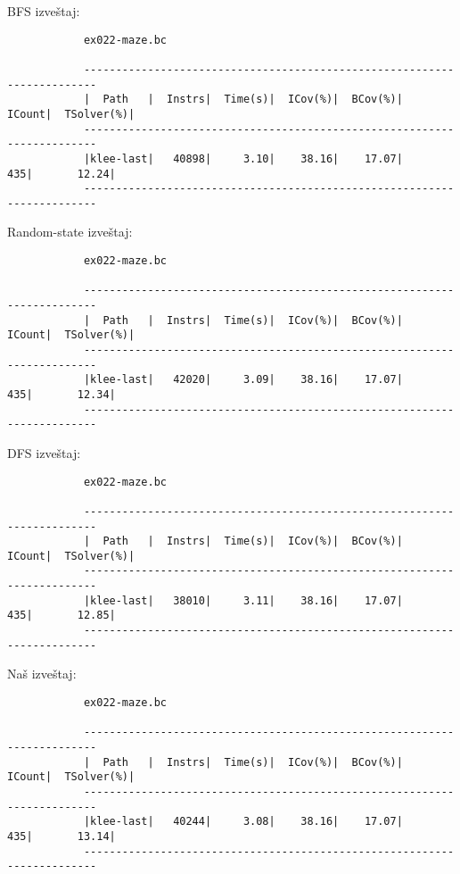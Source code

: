 \documentclass[a4paper]{article}
\begin{document}
{		BFS izveštaj:
		
		\begin{verbatim}
			ex022-maze.bc
			
			------------------------------------------------------------------------
			|  Path   |  Instrs|  Time(s)|  ICov(%)|  BCov(%)|  ICount|  TSolver(%)|
			------------------------------------------------------------------------
			|klee-last|   40898|     3.10|    38.16|    17.07|     435|       12.24|
			------------------------------------------------------------------------
		\end{verbatim}
		
		Random-state izveštaj:
		
		\begin{verbatim}
			ex022-maze.bc
			
			------------------------------------------------------------------------
			|  Path   |  Instrs|  Time(s)|  ICov(%)|  BCov(%)|  ICount|  TSolver(%)|
			------------------------------------------------------------------------
			|klee-last|   42020|     3.09|    38.16|    17.07|     435|       12.34|
			------------------------------------------------------------------------
		\end{verbatim}
		
		DFS izveštaj:
		
		\begin{verbatim}
			ex022-maze.bc
			
			------------------------------------------------------------------------
			|  Path   |  Instrs|  Time(s)|  ICov(%)|  BCov(%)|  ICount|  TSolver(%)|
			------------------------------------------------------------------------
			|klee-last|   38010|     3.11|    38.16|    17.07|     435|       12.85|
			------------------------------------------------------------------------
		\end{verbatim}
		
		Naš izveštaj:
		
		\begin{verbatim}
			ex022-maze.bc
			
			------------------------------------------------------------------------
			|  Path   |  Instrs|  Time(s)|  ICov(%)|  BCov(%)|  ICount|  TSolver(%)|
			------------------------------------------------------------------------
			|klee-last|   40244|     3.08|    38.16|    17.07|     435|       13.14|
			------------------------------------------------------------------------	
		\end{verbatim}
		
}
\end{document}
